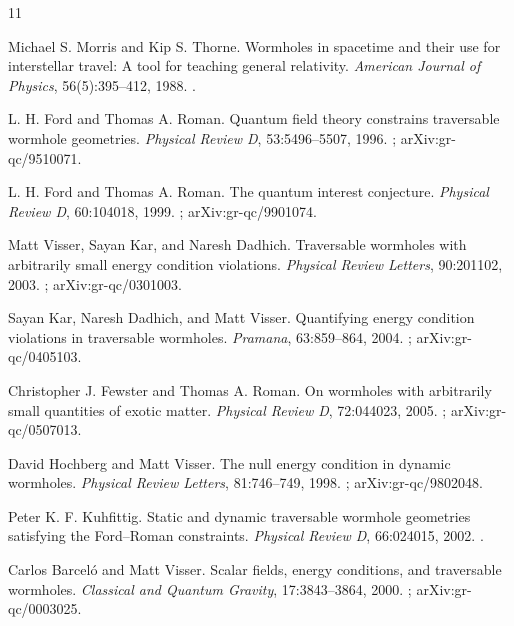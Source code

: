 \documentclass[11pt]{article}
\begin{document}
\begin{thebibliography}{11}

Michael S. Morris and Kip S. Thorne.
\newblock Wormholes in spacetime and their use for interstellar travel: A tool for teaching general relativity.
\newblock \emph{American Journal of Physics}, 56(5):395--412, 1988.
\newblock {}.

L. H. Ford and Thomas A. Roman.
\newblock Quantum field theory constrains traversable wormhole geometries.
\newblock \emph{Physical Review D}, 53:5496--5507, 1996.
\newblock {}; arXiv:gr-qc/9510071.

L. H. Ford and Thomas A. Roman.
\newblock The quantum interest conjecture.
\newblock \emph{Physical Review D}, 60:104018, 1999.
\newblock {}; arXiv:gr-qc/9901074.

Matt Visser, Sayan Kar, and Naresh Dadhich.
\newblock Traversable wormholes with arbitrarily small energy condition violations.
\newblock \emph{Physical Review Letters}, 90:201102, 2003.
\newblock {}; arXiv:gr-qc/0301003.

Sayan Kar, Naresh Dadhich, and Matt Visser.
\newblock Quantifying energy condition violations in traversable wormholes.
\newblock \emph{Pramana}, 63:859--864, 2004.
\newblock {}; arXiv:gr-qc/0405103.

Christopher J. Fewster and Thomas A. Roman.
\newblock On wormholes with arbitrarily small quantities of exotic matter.
\newblock \emph{Physical Review D}, 72:044023, 2005.
\newblock {}; arXiv:gr-qc/0507013.

David Hochberg and Matt Visser.
\newblock The null energy condition in dynamic wormholes.
\newblock \emph{Physical Review Letters}, 81:746--749, 1998.
\newblock {}; arXiv:gr-qc/9802048.

Peter K. F. Kuhfittig.
\newblock Static and dynamic traversable wormhole geometries satisfying the Ford--Roman constraints.
\newblock \emph{Physical Review D}, 66:024015, 2002.
\newblock {}.

Carlos Barcel\'{o} and Matt Visser.
\newblock Scalar fields, energy conditions, and traversable wormholes.
\newblock \emph{Classical and Quantum Gravity}, 17:3843--3864, 2000.
\newblock {}; arXiv:gr-qc/0003025.


\end{thebibliography}
\end{document}
